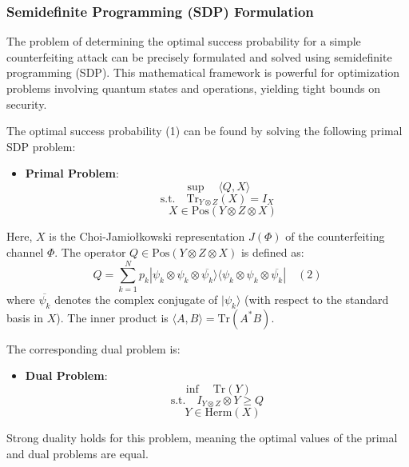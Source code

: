 \documentclass{article} %
\begin{document}





\subsubsection{Semidefinite Programming (SDP) Formulation}
The problem of determining the optimal success probability for a simple counterfeiting attack can be precisely formulated and solved using semidefinite programming (SDP). This mathematical framework is powerful for optimization problems involving quantum states and operations, yielding tight bounds on security.

The optimal success probability (1) can be found by solving the following primal SDP problem:
\begin{itemize}
    \item \textbf{Primal Problem}:
        $$ \sup \quad \langle Q, X \rangle $$
        $$ \text{s.t.} \quad \text{Tr}_{Y\otimes Z}(X) = I_X $$
        $$ \quad X \in \text{Pos}(Y \otimes Z \otimes X) $$
\end{itemize}
Here, $X$ is the Choi-Jamiołkowski representation $J(\Phi)$ of the counterfeiting channel $\Phi$. The operator $Q \in \text{Pos}(Y \otimes Z \otimes X)$ is defined as:
$$ Q = \sum_{k=1}^{N} p_k |\psi_k \otimes \psi_k \otimes \overline{\psi_k}\rangle \langle \psi_k \otimes \psi_k \otimes \overline{\psi_k}| \quad (2) $$
where $\overline{\psi_k}$ denotes the complex conjugate of $|\psi_k\rangle$ (with respect to the standard basis in $X$). The inner product is $\langle A,B\rangle = \text{Tr}(A^*B)$.

The corresponding dual problem is:
\begin{itemize}
    \item \textbf{Dual Problem}:
        $$ \inf \quad \text{Tr}(Y) $$
        $$ \text{s.t.} \quad I_{Y\otimes Z} \otimes Y \ge Q $$
        $$ \quad Y \in \text{Herm}(X) $$
\end{itemize}
Strong duality holds for this problem, meaning the optimal values of the primal and dual problems are equal.
\end{document}
